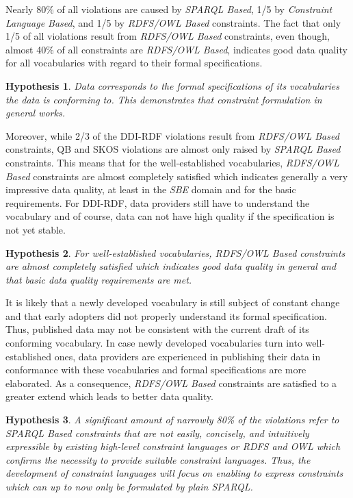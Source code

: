 \documentclass[conference]{IEEEtran}
\newcommand{\tb}[1]{\todo[size=\small, color=green!40]{\textbf{Thomas:} #1}}
\newtheorem{hyp}{Hypothesis}
\begin{document}
Nearly 80\% of all violations are caused by \emph{SPARQL Based}, 1/5 by \emph{Constraint Language Based}, and 1/5 by \emph{RDFS/OWL Based} constraints. The fact that only 1/5 of all violations result from \emph{RDFS/OWL Based} constraints, even though, almost 40\% of all constraints are \emph{RDFS/OWL Based}, indicates good data quality for all vocabularies with regard to their formal specifications.

\begin{hyp}
Data corresponds to the formal specifications of its vocabularies the data is conforming to. This demonstrates that constraint formulation in general works. 
\end{hyp}

Moreover, while 2/3 of the DDI-RDF violations result from \emph{RDFS/OWL Based} constraints,
QB and SKOS violations are almost only raised by \emph{SPARQL Based} constraints.
This means that for the well-established vocabularies, \emph{RDFS/OWL Based} constraints are almost completely satisfied which indicates generally a very impressive data quality, at least in the \emph{SBE} domain and for the basic requirements.
For DDI-RDF, data providers still have to understand the vocabulary and of course, data can not have high quality if the specification is not yet stable.

\begin{hyp}
For well-established vocabularies, RDFS/OWL Based constraints are almost completely satisfied which indicates good data quality in general and that basic data quality requirements are met.
\end{hyp}

It is likely that a newly developed vocabulary is still subject of constant change
and that early adopters did not properly understand its formal specification.
Thus, published data may not be consistent with the current draft of its conforming vocabulary.
In case newly developed vocabularies turn into well-established ones,
data providers are experienced in publishing their data in conformance with these vocabularies
and formal specifications are more elaborated. 
As a consequence, \emph{RDFS/OWL Based} constraints are satisfied to a greater extend which leads to better data quality.  

\begin{hyp}
A significant amount of narrowly 80\% of the violations refer to SPARQL Based constraints that are not easily, concisely, and intuitively expressible by existing high-level constraint languages or RDFS and OWL which confirms the necessity to provide suitable constraint languages. Thus, the development of constraint languages will focus on enabling to express constraints which can up to now only be formulated by plain SPARQL.
\end{hyp} 
\end{document}
